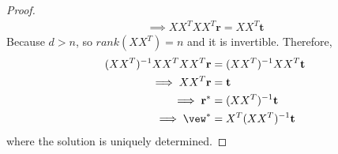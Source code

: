 \documentclass{article}
\begin{document}
\begin{proof}
\begin{align}
			\implies XX^T XX^T \textbf{r} = XX^T \textbf{t}
		\end{align}
		Because $d > n$, so $rank(XX^T) = n$ and it is invertible. Therefore,
		\begin{align}
			(XX^T)^{-1} XX^T XX^T \textbf{r} &= (XX^T)^{-1} XX^T \textbf{t} \\
			\implies XX^T \textbf{r} &= \textbf{t} \\
			\implies \textbf{r}^* &= (XX^T)^{-1} \textbf{t} \\
			\implies \vew^* &= X^T (XX^T)^{-1} \textbf{t}
		\end{align}
		where the solution is uniquely determined.
	\end{proof}
	
	\subsubsection{}
\end{document}
